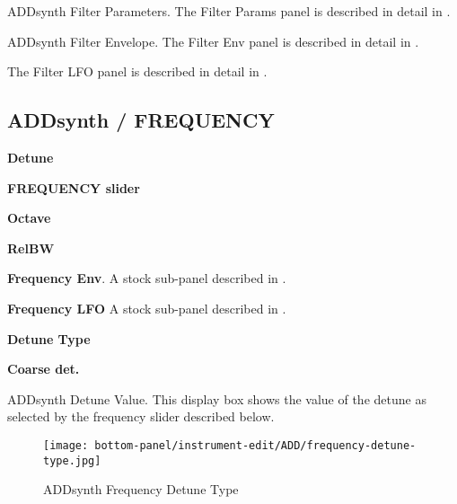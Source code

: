   \setcounter{ItemCounter}{0}      %

   ADDsynth Filter Parameters.
   The Filter Params panel is described in detail in
   .

   ADDsynth Filter Envelope.
   The Filter Env panel is described in detail in
   .

   The Filter LFO panel is described in detail in
   .

\subsection{ADDsynth / FREQUENCY}
\label{subsec:addsynth_frequency}

   \begin{enumber}
      \item \textbf{Detune}
      \item \textbf{FREQUENCY slider}
      \item \textbf{Octave}
      \item \textbf{RelBW}
      \item \textbf{Frequency Env}.
         A stock sub-panel described in
         .
      \item \textbf{Frequency LFO}
         A stock sub-panel described in
         .
      \item \textbf{Detune Type}
      \item \textbf{Coarse det.}
   \end{enumber}

   \setcounter{ItemCounter}{0}      %

   ADDsynth Detune Value.
   This display box shows the value of the detune as selected by the
   frequency slider described below.

\begin{figure}[H]
   \centering
   \texttt{[image: bottom-panel/instrument-edit/ADD/frequency-detune-type.jpg]}
   \caption{ADDsynth Frequency Detune Type}
   \label{fig:addsynth_freq_detune_type}
\end{figure}

